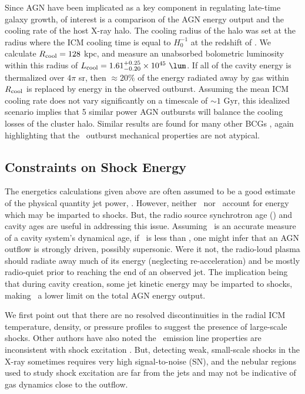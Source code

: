 \documentclass[useAMS,usenatbib]{mn2e}
\begin{document}
Since AGN have been implicated as a key component in regulating
late-time galaxy growth, of interest is a comparison of the AGN energy
output and the cooling rate of the host X-ray halo. The cooling radius
of the halo was set at the radius where the ICM cooling time is equal
to $H_0^{-1}$ at the redshift of \irs. We calculate $R_{\rm{cool}} =
128$ kpc, and measure an unabsorbed bolometric luminosity within this
radius of $L_{\rm{cool}} = 1.61^{+0.25}_{-0.20} \times 10^{45}
~\lum$. If all of the cavity energy is thermalized over $4\pi$ sr,
then $\approx 20\%$ of the energy radiated away by gas within
$R_{\rm{cool}}$ is replaced by energy in the observed
outburst. Assuming the mean ICM cooling rate does not vary
significantly on a timescale of $\sim 1$ Gyr, this idealized scenario
implies that 5 similar power AGN outbursts will balance the cooling
losses of the cluster halo. Similar results are found for many other
BCGs \citep[\eg][]{rafferty06}, again highlighting that the
\irs\ outburst mechanical properties are not atypical.

\subsection{Constraints on Shock Energy}

The energetics calculations given above are often assumed to be a good
estimate of the physical quantity jet power, \pjet. However, neither
\pcav\ nor \pjet\ account for energy which may be imparted to shocks.
But, the radio source synchrotron age (\tsync) and cavity ages are
useful in addressing this issue. Assuming \tsync\ is an accurate
measure of a cavity system's dynamical age, if \tsync\ is less than
\tsonic, one might infer that an AGN outflow is strongly driven,
possibly supersonic. Were it not, the radio-loud plasma should radiate
away much of its energy (neglecting re-acceleration) and be mostly
radio-quiet prior to reaching the end of an observed jet. The
implication being that during cavity creation, some jet kinetic energy
may be imparted to shocks, making \ecav\ a lower limit on the total
AGN energy output.

We first point out that there are no resolved discontinuities in the
radial ICM temperature, density, or pressure profiles to suggest the
presence of large-scale shocks. Other authors have also noted the
\irs\ emission line properties are inconsistent with shock excitation
\citep{1996MNRAS.283.1003C, 2000AJ....120..562T}. But, detecting weak,
small-scale shocks in the X-ray sometimes requires very high
signal-to-noise (SN), and the nebular regions used to study shock
excitation are far from the jets and may not be indicative of gas
dynamics close to the outflow.
\end{document}
